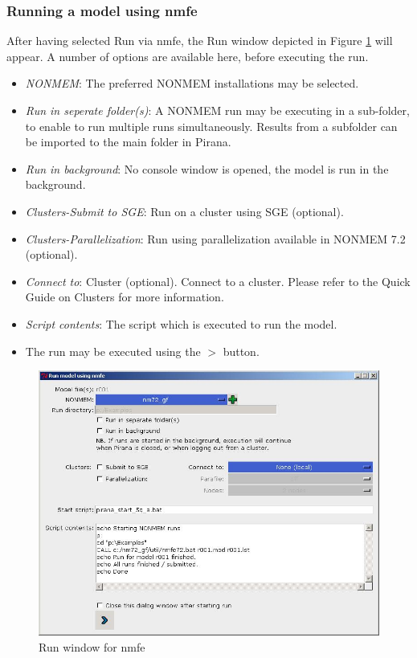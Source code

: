 
\subsubsection*{Running a model using nmfe} 
After having selected Run via nmfe, the Run window depicted in Figure
\ref{fig:Fig2} will appear. A number of options are available here, before
executing the run.
\begin{itemize}
\item \emph{NONMEM}: The preferred NONMEM installations may be selected. 
\item \emph{Run in seperate folder(s)}: A NONMEM run may be executing
  in a sub-folder, to enable to run multiple runs
  simultaneously. Results from a subfolder can be imported to the main
  folder in Pirana.
\item \emph{Run in background}: No console window is opened, the model
  is run in the background.
\item \emph{Clusters-Submit to SGE}: Run on a cluster using SGE (optional). 
\item \emph{Clusters-Parallelization}: Run using parallelization
  available in NONMEM 7.2 (optional).
\item \emph{Connect to}: Cluster (optional). Connect to a
  cluster. Please refer to the Quick Guide on Clusters for more information.
\item \emph{Script contents}: The script which is executed to run the model.
\item The run may be executed using the \emph{\Large{$>$}} button.
\end{itemize}

\begin{figure}[h] \centering
    \includegraphics[scale=.4]{images/working_4.jpg}
    \caption{Run window for nmfe\label{fig:Fig2}}
\end{figure}

